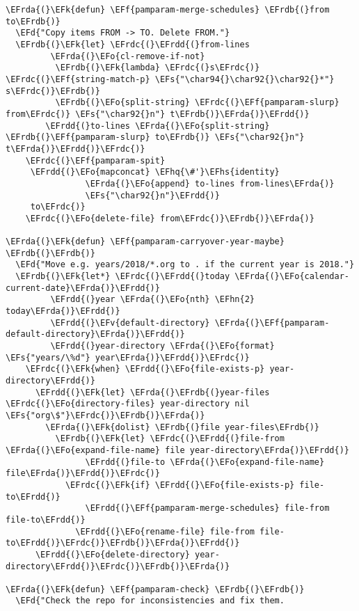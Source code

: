 \documentclass[a4wide,10pt]{article}
\newcommand{\EFs}[1]{\textcolor{EFs}{#1}} %
\newcommand{\EFd}[1]{\textcolor{EFd}{#1}} %
\newcommand{\EFk}[1]{\textcolor{EFk}{#1}} %
\newcommand{\EFf}[1]{\textcolor{EFf}{#1}} %
\newcommand{\EFv}[1]{\textcolor{EFv}{#1}} %
\newcommand{\EFo}[1]{\textcolor{EFo}{#1}} %
\newcommand{\EFhn}[1]{\textcolor{EFhn}{\textbf{#1}}} %
\newcommand{\EFhq}[1]{\textcolor{EFhq}{#1}} %
\newcommand{\EFhs}[1]{\textcolor{EFhs}{#1}} %
\newcommand{\EFrda}[1]{\textcolor{EFrda}{#1}} %
\newcommand{\EFrdb}[1]{\textcolor{EFrdb}{#1}} %
\newcommand{\EFrdc}[1]{\textcolor{EFrdc}{#1}} %
\newcommand{\EFrdd}[1]{\textcolor{EFrdd}{#1}} %
\begin{document}
\begin{Code}
\begin{Verbatim}
\EFrda{(}\EFk{defun} \EFf{pamparam-merge-schedules} \EFrdb{(}from to\EFrdb{)}
  \EFd{"Copy items FROM -> TO. Delete FROM."}
  \EFrdb{(}\EFk{let} \EFrdc{(}\EFrdd{(}from-lines
         \EFrda{(}\EFo{cl-remove-if-not}
          \EFrdb{(}\EFk{lambda} \EFrdc{(}s\EFrdc{)} \EFrdc{(}\EFf{string-match-p} \EFs{"\char94{}\char92{}\char92{}*"} s\EFrdc{)}\EFrdb{)}
          \EFrdb{(}\EFo{split-string} \EFrdc{(}\EFf{pamparam-slurp} from\EFrdc{)} \EFs{"\char92{}n"} t\EFrdb{)}\EFrda{)}\EFrdd{)}
        \EFrdd{(}to-lines \EFrda{(}\EFo{split-string} \EFrdb{(}\EFf{pamparam-slurp} to\EFrdb{)} \EFs{"\char92{}n"} t\EFrda{)}\EFrdd{)}\EFrdc{)}
    \EFrdc{(}\EFf{pamparam-spit}
     \EFrdd{(}\EFo{mapconcat} \EFhq{\#'}\EFhs{identity}
                \EFrda{(}\EFo{append} to-lines from-lines\EFrda{)}
                \EFs{"\char92{}n"}\EFrdd{)}
     to\EFrdc{)}
    \EFrdc{(}\EFo{delete-file} from\EFrdc{)}\EFrdb{)}\EFrda{)}

\EFrda{(}\EFk{defun} \EFf{pamparam-carryover-year-maybe} \EFrdb{(}\EFrdb{)}
  \EFd{"Move e.g. years/2018/*.org to . if the current year is 2018."}
  \EFrdb{(}\EFk{let*} \EFrdc{(}\EFrdd{(}today \EFrda{(}\EFo{calendar-current-date}\EFrda{)}\EFrdd{)}
         \EFrdd{(}year \EFrda{(}\EFo{nth} \EFhn{2} today\EFrda{)}\EFrdd{)}
         \EFrdd{(}\EFv{default-directory} \EFrda{(}\EFf{pamparam-default-directory}\EFrda{)}\EFrdd{)}
         \EFrdd{(}year-directory \EFrda{(}\EFo{format} \EFs{"years/\%d"} year\EFrda{)}\EFrdd{)}\EFrdc{)}
    \EFrdc{(}\EFk{when} \EFrdd{(}\EFo{file-exists-p} year-directory\EFrdd{)}
      \EFrdd{(}\EFk{let} \EFrda{(}\EFrdb{(}year-files \EFrdc{(}\EFo{directory-files} year-directory nil \EFs{"org\$"}\EFrdc{)}\EFrdb{)}\EFrda{)}
        \EFrda{(}\EFk{dolist} \EFrdb{(}file year-files\EFrdb{)}
          \EFrdb{(}\EFk{let} \EFrdc{(}\EFrdd{(}file-from \EFrda{(}\EFo{expand-file-name} file year-directory\EFrda{)}\EFrdd{)}
                \EFrdd{(}file-to \EFrda{(}\EFo{expand-file-name} file\EFrda{)}\EFrdd{)}\EFrdc{)}
            \EFrdc{(}\EFk{if} \EFrdd{(}\EFo{file-exists-p} file-to\EFrdd{)}
                \EFrdd{(}\EFf{pamparam-merge-schedules} file-from file-to\EFrdd{)}
              \EFrdd{(}\EFo{rename-file} file-from file-to\EFrdd{)}\EFrdc{)}\EFrdb{)}\EFrda{)}\EFrdd{)}
      \EFrdd{(}\EFo{delete-directory} year-directory\EFrdd{)}\EFrdc{)}\EFrdb{)}\EFrda{)}

\EFrda{(}\EFk{defun} \EFf{pamparam-check} \EFrdb{(}\EFrdb{)}
  \EFd{"Check the repo for inconsistencies and fix them.


\end{Verbatim}
\end{Code}
\end{document}
